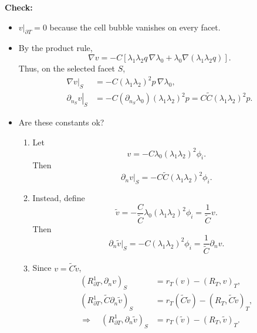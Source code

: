 \documentclass[12pt,a4paper]{article}
\newcommand{\dn}{\partial_n}
\newcommand{\Rone}{R_{\partial T}^{1}}
\begin{document}
\textbf{Check:}
\begin{itemize}
    \item $v|_{\partial T}=0$ because the cell bubble vanishes on every facet.
    \item By the product rule,
    \begin{equation}
        \nabla v=-C\left[\lambda_1\lambda_2q\,\nabla\lambda_0
             +\lambda_0\nabla(\lambda_1\lambda_2q)\right].
    \end{equation}
    Thus, on the selected facet $S$,
    \begin{align}
        \left.\nabla v\right|_S
            &=-C(\lambda_1\lambda_2)^2p\,\nabla\lambda_0,\\
        \left.\partial_{n_S}v\right|_S
            &=-C(\partial_{n_S}\lambda_0)(\lambda_1\lambda_2)^2p
             =C\tilde C(\lambda_1\lambda_2)^2p.
    \end{align}



\item Are these constants ok? 
\begin{enumerate}[label=\roman*)]
    \item Let
    \begin{equation}
        v=- C\lambda_0(\lambda_1\lambda_2)^2\phi_i.
    \end{equation}
    Then
    \begin{equation}
        \dn v|_S=-C\widetilde C(\lambda_1\lambda_2)^2\phi_i.
    \end{equation}

    \item Instead, define
    \begin{equation}
        \widetilde v
           =- \frac{C}{\widetilde C}\lambda_0(\lambda_1\lambda_2)^2\phi_i
           =\frac{1}{\widetilde C}v.
    \end{equation}
    Then
    \begin{equation}
        \dn\widetilde v|_S
          =-C(\lambda_1\lambda_2)^2\phi_i
          =\frac{1}{\widetilde C}\dn v.
    \end{equation}

    \item Since $v=\widetilde C\widetilde v$,
    \begin{align}
        (\Rone,\dn v)_S
            &=r_T(v)-(R_T,v)_T,\\
        (\Rone,\widetilde C\dn\widetilde v)_S
            &=r_T(\widetilde C\widetilde v)
                    -(R_T,\widetilde C\widetilde v)_T,\\
        \Longrightarrow\quad
        (\Rone,\dn\widetilde v)_S
            &=r_T(\widetilde v)-(R_T,\widetilde v)_T.
    \end{align}


\end{enumerate}
\end{itemize}
\end{document}
